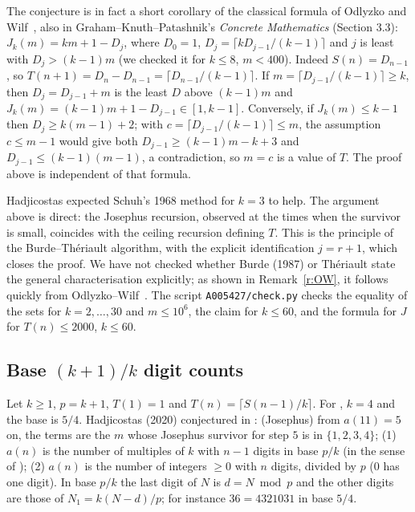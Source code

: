\begin{remark}\label{r:OW} The conjecture is in fact a short corollary of the classical formula of Odlyzko
and Wilf~\cite{OW}, also in Graham--Knuth--Patashnik's \emph{Concrete Mathematics} (Section 3.3):
$J_k(m)=km+1-D_j$, where $D_0=1$, $D_j=\lceil kD_{j-1}/(k-1)\rceil$ and $j$ is least with $D_j>(k-1)m$
(we checked it for $k\le8$, $m<400$). Indeed $S(n)=D_{n-1}$, so $T(n+1)=D_n-D_{n-1}=\lceil D_{n-1}/(k-1)\rceil$. If
$m=\lceil D_{j-1}/(k-1)\rceil\ge k$, then $D_j=D_{j-1}+m$ is the least $D$ above $(k-1)m$ and
$J_k(m)=(k-1)m+1-D_{j-1}\in[1,k-1]$. Conversely, if $J_k(m)\le k-1$ then $D_j\ge k(m-1)+2$; with
$c=\lceil D_{j-1}/(k-1)\rceil\le m$, the assumption $c\le m-1$ would give both $D_{j-1}\ge(k-1)m-k+3$ and
$D_{j-1}\le(k-1)(m-1)$, a contradiction, so $m=c$ is a value of $T$. The proof above is independent of that formula.
\end{remark}
\begin{remark} Hadjicostas expected Schuh's 1968 method for $k=3$ to help. The argument above is direct: the
Josephus recursion, observed at the times when the survivor is small, coincides with the ceiling recursion
defining $T$. This is the principle of the Burde--Thériault algorithm, with the explicit identification
$j=r+1$, which closes the proof. We have not checked whether Burde (1987) or Thériault state the general
characterisation explicitly; as shown in Remark~\ref{r:OW}, it follows quickly from Odlyzko--Wilf~\cite{OW}. The script \texttt{A005427/check.py} checks the equality of the
sets for $k=2,\dots,30$ and $m\le10^6$, the claim for $k\le60$, and the formula for $J$ for $T(n)\le2000$,
$k\le60$.\end{remark}

\subsection{Base \texorpdfstring{$(k+1)/k$}{(k+1)/k} digit counts}\label{s:A120160}
Let $k\ge1$, $p=k+1$, $T(1)=1$ and $T(n)=\lceil S(n-1)/k\rceil$. For , $k=4$ and the base is
$5/4$. Hadjicostas (2020) conjectured in : (Josephus) from $a(11)=5$ on, the terms are the
$m$ whose Josephus survivor for step $5$ is in $\{1,2,3,4\}$; (1) $a(n)$ is the number of multiples of $k$
with $n-1$ digits in base $p/k$ (in the sense of ); (2) $a(n)$ is the number of integers $\ge0$
with $n$ digits, divided by $p$ ($0$ has one digit). In base $p/k$ the last digit of $N$ is $d=N\bmod p$ and the
other digits are those of $N_1=k(N-d)/p$; for instance $36=4321031$ in base $5/4$.

